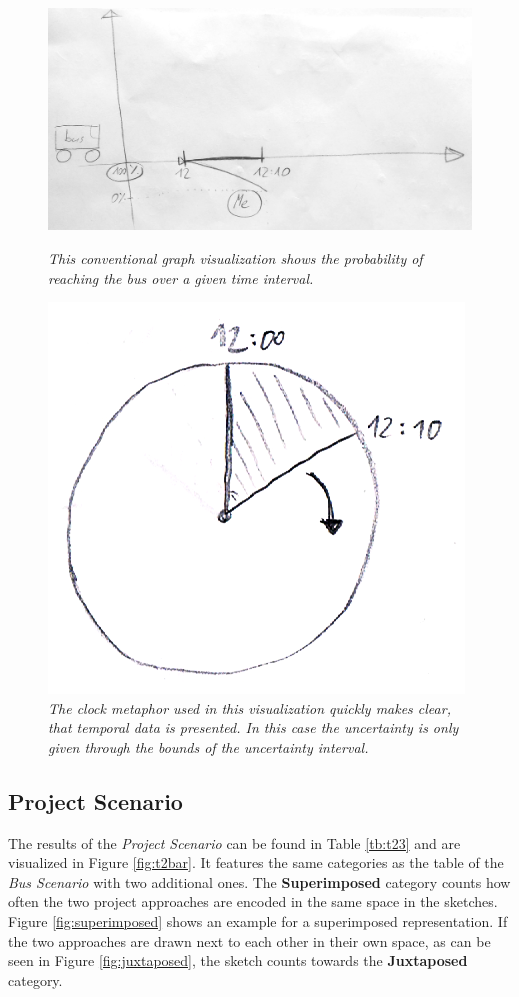 \begin{itemize}
	\begin{figure}[H]
		\begin{minipage}{.5\textwidth}
			\centering
			\captionsetup{width=0.8\textwidth}
			\includegraphics[height=0.5\textwidth]{figures/graph.jpg}
			\caption{\textit{This conventional graph visualization shows the probability of reaching the bus over a given time interval.}}
			\label{fig:graph}
		\end{minipage}
		\begin{minipage}{.45\textwidth}
			\centering
			\captionsetup{width=1.0\textwidth}
			\includegraphics[height=0.5\textwidth]{figures/clock.png}
			\caption{\textit{The clock metaphor used in this visualization quickly makes clear, that temporal data is presented. In this case the uncertainty is only given through the bounds of the uncertainty interval.}}
			\label{fig:clock}
		\end{minipage}
	\end{figure}
\end{itemize}


\subsection*{Project Scenario}
The results of the \textit{Project Scenario} can be found in Table \ref{tb:t23} and are visualized in Figure \ref{fig:t2bar}. It features the same categories as the table of the \textit{Bus Scenario} with two additional ones. The \textbf{Superimposed} category counts how often the two project approaches are encoded in the same space in the sketches. Figure \ref{fig:superimposed} shows an example for a superimposed representation. If the two approaches are drawn next to each other in their own space, as can be seen in Figure \ref{fig:juxtaposed}, the sketch counts towards the \textbf{Juxtaposed} category.

